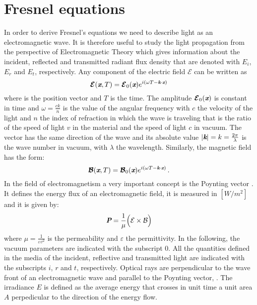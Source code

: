 \section{Fresnel equations}
In order to derive Fresnel's equations we need to describe light as an electromagnetic wave. 
It is therefore useful to study the light propagation from the perspective of Electromagnetic Theory which gives information about the incident, reflected and transmitted radiant flux density that are denoted with $E_i$, $E_r$ and $E_t$, respectively.  
Any component of the electric field $\boldsymbol{\mathcal{E}}$ can be written as
\begin{equation}
\boldsymbol{\mathcal{E}}(\textit{\textbf{x}}, T) = \boldsymbol{\mathcal{E}}_0(\textit{\textbf{x}} )e^{i(\omega T - \textit{\textbf{k}}\cdot \textit{\textbf{x}})}
\end{equation}
where  is the position vector and $T$ is the time. The amplitude $\boldsymbol{\mathcal{E}}_0(\textit{\textbf{x}})$ is constant in time and $\omega = \frac{c k}{n}$ is the value of the angular frequency with $c$ the velocity of the light and $n$ the index of refraction in which the wave is traveling that is the ratio of the speed of light $v$ in the material and the speed of light $c$ in vacuum. The vector  has the same direction of the wave and its absolute value 
$|\textit{\textbf{k}}| = k = \frac{2\pi}{\lambda}$ is the wave number in vacuum, with $\lambda$ the wavelength. Similarly, the magnetic field has the form:
\begin{equation}
\boldsymbol{\mathcal{B}}(\textit{\textbf{x}}, T) = \boldsymbol{\mathcal{B}}_0(\textit{\textbf{x}}) e^{i(\omega T - \textit{\textbf{k}}\cdot \textit{\textbf{x}})}\,.
\end{equation}
In the field of electromagnetism a very important concept is the Poynting vector . 
It defines the energy flux of an electromagnetic field,  it is measured in $[W/m^2]$ and it is given by:
\begin{equation}
\textit{\textbf{P}} = \frac{1}{\mu}\Big(\mathcal{E}\times \mathcal{B}\Big)
\end{equation}
where $\mu = \frac{1}{\varepsilon v^2}$ is the permeability and $\varepsilon$ the permittivity. In the following, the vacuum parameters are indicated with the subscript $0$. All the quantities defined in the media of the incident, reflective and transmitted light are indicated with the subscripts $i$, $r$ and $t$, respectively. Optical rays are perpendicular to the wave front of an electromagnetic wave and parallel to the Poynting vector, \cite{jones2015optical}.
The irradiance $E$ is defined as the average energy that crosses in unit time a unit area $A$ perpedicular to the direction of the energy flow.
